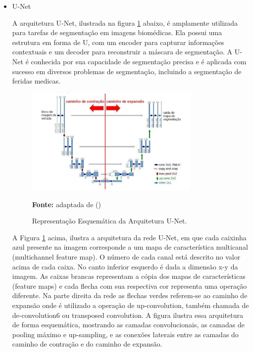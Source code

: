 \begin{itemize}
        \clearpage
        
        \item {U-Net}
    
            A arquitetura \ac{U-Net}, ilustrada na figura \ref{fig:arquiteturaUNet} abaixo,  é amplamente utilizada para tarefas de segmentação em imagens biomédicas. Ela possui uma estrutura em forma de U, com um encoder para capturar informações contextuais e um decoder para reconstruir a máscara de segmentação. A \ac{U-Net} é conhecida por sua capacidade de segmentação precisa e é aplicada com sucesso em diversos problemas de segmentação, incluindo a segmentação de feridas medicas. 
    
            \begin{figure}[htbp]
                \centering
                 \caption{Representação Esquemática da Arquitetura \ac{U-Net}. }
                \includegraphics[width=0.8\textwidth]{img/arquitetura_U-Net.png}
                \label{fig:arquiteturaUNet}
                \par\medskip\textbf{Fonte:} adaptada de (\cite{ronneberger2015u})
            \end{figure}
            
                A Figura \ref{fig:arquiteturaUNet} acima, ilustra a arquitetura da rede \ac{U-Net}, em que cada caixinha azul presente na imagem corresponde a um mapa de característica multicanal (multichannel feature map). O número de cada canal está descrito no valor acima de cada caixa. No canto inferior esquerdo é dada a dimensão x-y da imagem. As caixas brancas representam a cópia dos mapas de características (feature maps) e cada flecha com sua respectiva cor representa uma operação diferente. Na parte direita da rede as flechas verdes referem-se ao caminho de expansão onde é utilizado a operação de up-convolution, também chamada de de-convolution6 ou transposed convolution. A figura ilustra essa arquitetura de forma esquemática, mostrando as camadas convolucionais, as camadas de pooling máximo e up-sampling, e as conexões laterais entre as camadas do caminho de contração e do caminho de expansão.
    

\end{itemize}
